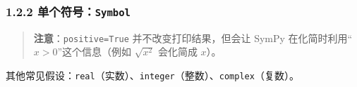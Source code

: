 \begin{Shaded}
\begin{Highlighting}[]
\OperatorTok{=}\NormalTok{)}
\OperatorTok{+}\OperatorTok{+}
\end{Highlighting}
\end{Shaded}

\begin{Shaded}
\begin{Highlighting}[]
\end{Highlighting}
\end{Shaded}

\subsubsection{\texorpdfstring{1.2.2
单个符号：\texttt{Symbol}}{1.2.2 单个符号：Symbol}}\label{ux5355ux4e2aux7b26ux53f7symbol}

\begin{Shaded}
\begin{Highlighting}[]
\OperatorTok{=}\NormalTok{)}

\OperatorTok{=}\OperatorTok{=}\NormalTok{)}
\end{Highlighting}
\end{Shaded}

\begin{Shaded}
\begin{Highlighting}[]
\end{Highlighting}
\end{Shaded}

\begin{quote}
\textbf{注意}：\texttt{positive=True} 并不改变打印结果，但会让 SymPy
在化简时利用``\(x>0\)''这个信息（例如 \(\sqrt{x^2}\) 会化简成 \(x\)）。
\end{quote}

其他常见假设：\texttt{real}（实数）、\texttt{integer}（整数）、\texttt{complex}（复数）。

\begin{Shaded}
\begin{Highlighting}[]
\OperatorTok{=}\OperatorTok{=}\NormalTok{)}
\OperatorTok{=}\OperatorTok{=}\NormalTok{)}
\end{Highlighting}
\end{Shaded}

